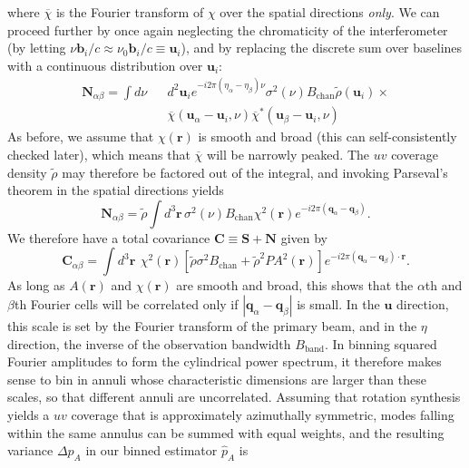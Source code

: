 \documentclass[twocolumn,aps,prd,nofootinbib,showpacs]{revtex4-1}
\begin{document}
where $\overline{\chi}$ is the Fourier transform of $\chi$ over the spatial directions \emph{only}.  We can proceed further by once again neglecting the chromaticity of the interferometer (by letting $\nu \mathbf{b}_i / c \approx \nu_0 \mathbf{b}_i / c \equiv \mathbf{u}_i$), and by replacing the discrete sum over baselines with a continuous distribution over $\mathbf{u}_i$:
\begin{eqnarray}
\mathbf{N}_{\alpha \beta} = \int d\nu  &&d^2\mathbf{u}_i e^{-i 2\pi (\eta_\alpha - \eta_\beta) \nu} \sigma^2 (\nu) B_\textrm{chan}\tilde{\rho}(\mathbf{u}_i) \times \nonumber \\
&&  \overline{\chi} \left(\mathbf{u}_\alpha -  \mathbf{u}_i, \nu \right) \overline{\chi}^* \left(\mathbf{u}_\beta - \mathbf{u}_i, \nu \right)
\end{eqnarray}
As before, we assume that $\chi(\mathbf{r})$ is smooth and broad (this can self-consistently checked later), which means that $\overline{\chi}$ will be narrowly peaked.  The $uv$ coverage density $\tilde{\rho}$ may therefore be factored out of the integral, and invoking Parseval's theorem in the spatial directions yields
\begin{equation}
\mathbf{N}_{\alpha \beta} = \tilde{\rho} \int d^3 \mathbf{r} \, \sigma^2 (\nu) B_\textrm{chan} \chi^2 (\mathbf{r}) e^{-i 2\pi (\mathbf{q}_\alpha - \mathbf{q}_\beta)}.
\end{equation}
We therefore have a total covariance $\mathbf{C} \equiv \mathbf{S} + \mathbf{N}$ given by
\begin{equation}
\label{eq:Ctot}
\mathbf{C}_{\alpha \beta} =\int d^3 \mathbf{r} \,\  \chi^2 (\mathbf{r}) \left[ \tilde{\rho} \sigma^2 B_\textrm{chan}  + \tilde{\rho}^2 P A^2 (\mathbf{r}) \right] e^{-i 2 \pi (\mathbf{q}_\alpha - \mathbf{q}_\beta) \cdot \mathbf{r}}.
\end{equation}
As long as $A(\mathbf{r})$ and $\chi(\mathbf{r})$ are smooth and broad, this shows that the $\alpha$th and $\beta$th Fourier cells will be correlated only if $|\mathbf{q}_\alpha - \mathbf{q}_\beta|$ is small.  In the $\mathbf{u}$ direction, this scale is set by the Fourier transform of the primary beam, and in the $\eta$ direction, the inverse of the observation bandwidth $B_\textrm{band}$.  In binning squared Fourier amplitudes to form the cylindrical power spectrum, it therefore makes sense to bin in annuli whose characteristic dimensions are larger than these scales, so that different annuli are uncorrelated.  Assuming that rotation synthesis yields a $uv$ coverage that is approximately azimuthally symmetric, modes falling within the same annulus can be summed with equal weights, and the resulting variance $\Delta p_A$ in our binned estimator $\widehat{p}_A$ is
\end{document}
